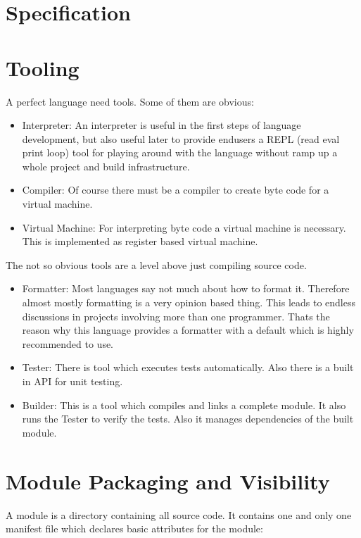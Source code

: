 \documentclass[11pt,a4paper]{report}
\begin{document}
\section{Specification}

\section{Tooling}

A perfect language need tools. Some of them are obvious:

\begin{itemize}
    \item Interpreter: An interpreter is useful in the first steps of language development, but also useful later to provide endusers a REPL (read eval print loop) tool for playing around with the language without ramp up a whole project and build infrastructure.
    \item Compiler: Of course there must be a compiler to create byte code for a virtual machine.
    \item Virtual Machine: For interpreting byte code a virtual machine is necessary. This is implemented as register based virtual machine.
\end{itemize}

The not so obvious tools are a level above just compiling source code.

\begin{itemize}
    \item Formatter: Most languages say not much about how to format it. Therefore almost mostly formatting is a very opinion based thing. This leads to endless discussions in projects involving more than one programmer. Thats the reason why this language provides a formatter with a default which is highly recommended to use.
    \item Tester: There is tool which executes tests automatically. Also there is a built in API for unit testing.
    \item Builder: This is a tool which compiles and links a complete module. It also runs the Tester to verify the tests. Also it manages dependencies of the built module.
\end{itemize}

\section{Module Packaging and Visibility}

A module is a directory containing all source code. It contains one and only one manifest file which declares basic attributes for the module:
\end{document}
